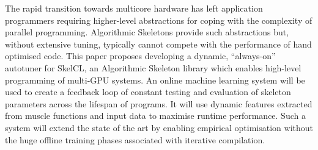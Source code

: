 The rapid transition towards multicore hardware has left application
programmers requiring higher-level abstractions for coping with the
complexity of parallel programming. Algorithmic Skeletons provide such
abstractions but, without extensive tuning, typically cannot compete
with the performance of hand optimised code. This paper proposes
developing a dynamic, ``always-on'' autotuner for SkelCL, an
Algorithmic Skeleton library which enables high-level programming of
multi-GPU systems. An online machine learning system will be used to
create a feedback loop of constant testing and evaluation of skeleton
parameters across the lifespan of programs. It will use dynamic
features extracted from muscle functions and input data to maximise
runtime performance. Such a system will extend the state of the art by
enabling empirical optimisation without the huge offline training
phases associated with iterative compilation.
